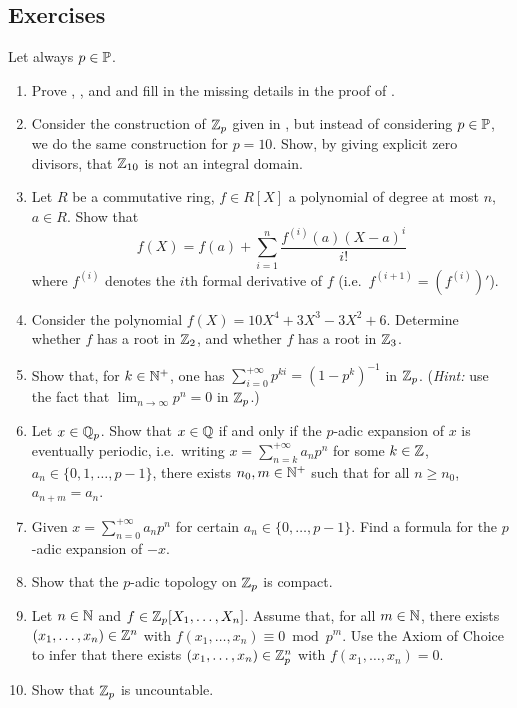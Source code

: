 \documentclass[12pt, leqno, british]{amsart}
\begin{document}
\subsection{Exercises}
Let always $p \in \mathbb P$.
\begin{enumerate}
\item Prove , , and  and fill in the missing details in the proof of .
\item 
Consider the construction of $\mathbb Z_p$ given in , but instead of considering $p \in \mathbb P$, we do the same construction for $p = 10$.
Show, by giving explicit zero divisors, that $\mathbb Z_{10}$ is not an integral domain.
\item\label{ex:formal-Taylor} Let $R$ be a commutative ring, $f \in R[X]$ a polynomial of degree at most $n$, $a \in R$.
Show that
\begin{displaymath}
f(X) = f(a) + \sum_{i=1}^n \frac{f^{(i)}(a)(X-a)^i}{i!}
\end{displaymath}
where $f^{(i)}$ denotes the $i$th formal derivative of $f$ (i.e.~$f^{(i+1)} = (f^{(i)})'$).
\item Consider the polynomial $f(X) = 10X^4 + 3X^3 - 3X^2 + 6$.
Determine whether $f$ has a root in $\mathbb Z_2$, and whether $f$ has a root in $\mathbb Z_3$.
\item\label{ex:geometric-series} Show that, for $k \in \mathbb N^+$, one has $\sum_{i=0}^{+\infty} p^{ki} = (1-p^k)^{-1}$ in $\mathbb Z_p$. (\textit{Hint:} use the fact that $\lim_{n \to \infty} p^n = 0$ in $\mathbb Z_p$.)
\item\label{ex:p-adic-periodic} Let $x \in \mathbb Q_p$.
Show that $x \in \mathbb Q$ if and only if the $p$-adic expansion of $x$ is eventually periodic, i.e.~writing $x = \sum_{n=k}^{+\infty} a_np^n$ for some $k \in \mathbb Z$, $a_n \in \lbrace 0, 1, \ldots, p-1 \rbrace$, there exists $n_0, m \in \mathbb N^+$ such that for all $n \geq n_0$, $a_{n+m} = a_n$.
\item Given $x = \sum_{n=0}^{+\infty} a_np^n$ for certain $a_n \in \lbrace 0, \ldots, p-1\rbrace$.
Find a formula for the $p$-adic expansion of $-x$.
\item Show that the $p$-adic topology on $\mathbb Z_p$ is compact.
\item\label{ex:solution-patching} Let $n \in \mathbb N$ and $f \in \mathbb Z_p[X_1, \ldots, X_n]$.
Assume that, for all $m \in \mathbb N$, there exists $(x_1, \ldots, x_n) \in \mathbb Z^n$ with $f(x_1, \ldots, x_n) \equiv 0 \bmod p^m$.
Use the Axiom of Choice to infer that there exists $(x_1, \ldots, x_n) \in \mathbb Z_p^n$ with $f(x_1, \ldots, x_n) = 0$.
\item Show that $\mathbb Z_p$ is uncountable.
\end{enumerate}
\end{document}
